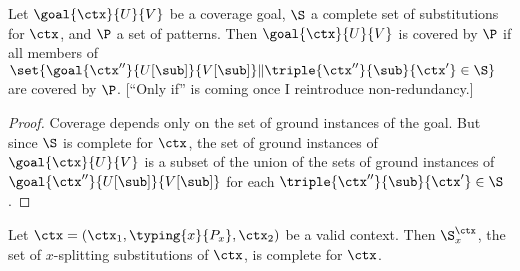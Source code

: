 
\begin{theorem}
\label{thm:conservativity-coverage}
Let $\goal{\ctx}{U}{V}$ be a coverage goal, $\S$ a complete set of substitutions for $\ctx$, and $\P$ a set of patterns.
Then $\goal{\ctx}{U}{V}$ is covered by $\P$ if all members of $\set{\goal{\ctx''}{U[\sub]}{V[\sub]} \| \triple{\ctx''}{\sub}{\ctx'} \in \S}$ are covered by $\P$.
[``Only if'' is coming once I reintroduce non-redundancy.] %
\end{theorem}

\begin{proof}
Coverage depends only on the set of ground instances of the goal.
But since $\S$ is complete for $\ctx$, the set of ground instances of $\goal{\ctx}{U}{V}$ is a subset of the union of the sets of ground instances of $\goal{\ctx''}{U[\sub]}{V[\sub]}$ for each $\triple{\ctx''}{\sub}{\ctx'} \in \S$.
\end{proof}

\begin{theorem}
\label{thm:splitting-complete}
Let $\ctx = (\ctx_1, \typing{x}{P_x}, \ctx_2)$ be a valid context.
Then $\S^{\ctx}_x$, the set of $x$-splitting substitutions of $\ctx$, is complete for $\ctx$.
\end{theorem}

